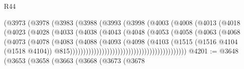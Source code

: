\begin{lexlean}{R44}
\begin{coremodule}
{                                    (@3973
                                      (@3978
                                        (@3983
                                          (@3988
                                            (@3993
                                              (@3998
                                                (@4003
                                                  (@4008
                                                    (@4013
                                                      (@4018
                                                        (@4023
                                                          (@4028
                                                            (@4033
                                                              (@4038
                                                                (@4043
                                                                  (@4048
                                                                    (@4053
                                                                      (@4058
                                                                        (@4063
                                                                          (@4068
                                                                            (@4073
                                                                              (@4078
                                                                                (@4083
                                                                                  (@4088
                                                                                    (@4093
                                                                                      (@4098
                                                                                        (@4103
                                                                                          (@1515
                                                                                            (@1516
                                                                                              @4104
                                                                                              (@1518
                                                                                                @4104))
                                                                                            @815))))))))))))))))))))))))))))))))))))))))))))
@4201 := @3648
    (@3653
      (@3658
        (@3663
          (@3668
            (@3673
              (@3678
}
\end{coremodule}
\end{lexlean}
